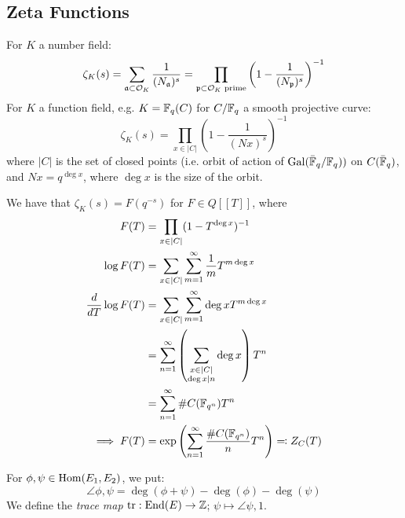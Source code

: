\documentclass[10pt,a4paper]{article}
\begin{document}
\subsection{Zeta Functions}
For $K$ a number field:
\[\zeta_K(s) = \sum_{\mathfrak{a} \subset \mathcal{O}_K} \frac{1}{(N_{\mathfrak{a}})^s} = \prod_{\mathfrak{p}\subset \mathcal{O}_K \text{ prime}} \left(1-\frac{1}{(N_{\mathfrak{p}})^s}\right)^{-1}\]
For $K$ a function field, e.g. $K = \mathbb{F}_q(C)$ for $C/\mathbb{F}_q$ a smooth projective curve:
\[\zeta_K(s) = \prod_{x\in |C|}\left(1-\frac{1}{(Nx)^s}\right)^{-1}\]
where $|C|$ is the set of closed points (i.e. orbit of action of $\operatorname{Gal}(\bar{\mathbb{F}}_q/\mathbb{F}_q))$ on $C(\bar{\mathbb{F}}_q)$, and $Nx = q^{\deg x}$, where $\deg x$ is the size of the orbit.

We have that $\zeta_K(s) = F(q^{-s})$ for $F \in Q[[T]]$, where
\begin{align*}
  F(T) &= \prod_{x \in |C|} (1-T^{\deg x})^{-1}\\
  \log F(T) &= \sum_{x \in |C|} \sum_{m=1}^\infty \frac{1}{m}T^{m\deg x}\\
  \frac{d}{dT} \log F(T) &= \sum_{x \in |C|}\sum_{m=1}^\infty \deg x T^{m \deg x}\\
  &= \sum_{n=1}^\infty \left(\sum_{\substack{x \in |C|\\\deg x |n}} \deg x\right)T^n\\
  &= \sum_{n=1}^\infty \# C(\mathbb{F}_{q^n})T^n\\
  \implies F(T) &= \exp\left(\sum_{n=1}^\infty \frac{\#C(\mathbb{F}_{q^n})}{n}T^n\right) \eqqcolon Z_C(T)
\end{align*}

For $\phi, \psi \in \operatorname{Hom}(E_1, E_2)$, we put:
\[\angle{\phi, \psi} = \deg(\phi+\psi) - \deg(\phi) - \deg(\psi)\]
We define the \emph{trace map} $\operatorname{tr}: \operatorname{End}(E) \to \mathbb{Z}$; $\psi \mapsto \angle{\psi, 1}$.
\end{document}
